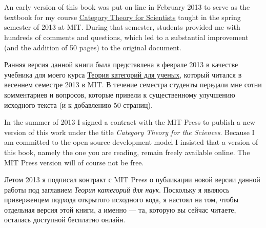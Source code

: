 \documentclass[CT4S-EN-RU]{subfiles}
\begin{document}
\chapter*{}

\begin{blockENG}
An early version of this book was put on line in February 2013 to serve as the textbook for my course \href{http://math.mit.edu/~dspivak/teaching/sp13/}{\text Category Theory for Scientists} taught in the spring semester of 2013 at MIT. During that semester, students provided me with hundreds of comments and questions, which led to a substantial improvement (and the addition of 50 pages) to the original document.
\end{blockENG}

\begin{blockRUS}
Ранняя версия данной книги была представлена в феврале 2013 в качестве учебника для моего курса \href{http://math.mit.edu/~dspivak/teaching/sp13/}{\text Теория категорий для ученых},%
 который читался в весеннем семестре 2013 в MIT. В течение семестра студенты передали мне сотни комментариев и вопросов, которые привели к существенному улучшению исходного текста (и к добавлению 50 страниц).
\end{blockRUS}

\begin{blockENG}
In the summer of 2013 I signed a contract with the MIT Press to publish a new version of this work under the title {\em Category Theory for the Sciences}. Because I am committed to the open source development model I insisted that a version of this book, namely the one you are reading, remain freely available online. The MIT Press version will of course not be free.
\end{blockENG}

\begin{blockRUS}
Летом 2013 я подписал контракт с MIT Press о публикации новой версии данной работы под заглавием {\em Теория категорий для наук}. Поскольку я являюсь приверженцем подхода открытого исходного кода, я настоял на том, чтобы отдельная версия этой книги, а именно — та, которую вы сейчас читаете, осталась доступной бесплатно онлайн.%
\end{blockRUS}
\end{document}
